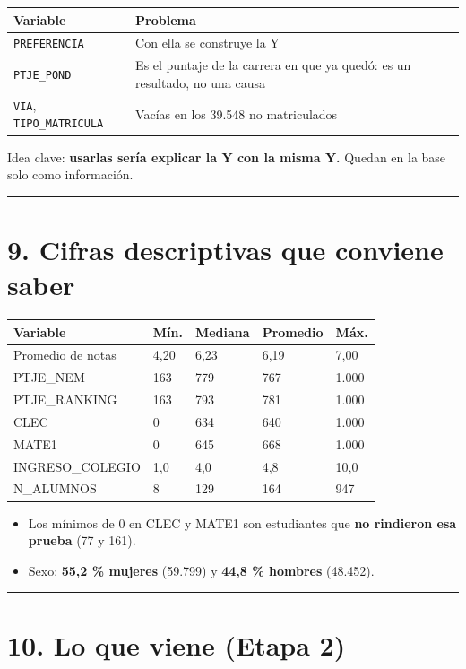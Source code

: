 \documentclass[11pt]{article}
\begin{document}
\begin{tabularx}{\linewidth}{lX}\toprule
\textbf{Variable} & \textbf{Problema}\\ \midrule
\texttt{PREFERENCIA} & Con ella se construye la Y\\
\texttt{PTJE\_POND} & Es el puntaje de la carrera en que ya quedó: es un resultado, no una causa\\
\texttt{VIA}, \texttt{TIPO\_MATRICULA} & Vacías en los 39.548 no matriculados\\
\bottomrule\end{tabularx}\medskip

Idea clave: \textbf{usarlas sería explicar la Y con la misma Y.} Quedan en la base solo como información.\par

\medskip\hrule\medskip

\section*{9. Cifras descriptivas que conviene saber}

\begin{tabularx}{\linewidth}{Xllll}\toprule
\textbf{Variable} & \textbf{Mín.} & \textbf{Mediana} & \textbf{Promedio} & \textbf{Máx.}\\ \midrule
Promedio de notas & 4,20 & 6,23 & 6,19 & 7,00\\
PTJE\_NEM & 163 & 779 & 767 & 1.000\\
PTJE\_RANKING & 163 & 793 & 781 & 1.000\\
CLEC & 0 & 634 & 640 & 1.000\\
MATE1 & 0 & 645 & 668 & 1.000\\
INGRESO\_COLEGIO & 1,0 & 4,0 & 4,8 & 10,0\\
N\_ALUMNOS & 8 & 129 & 164 & 947\\
\bottomrule\end{tabularx}\medskip

\begin{itemize}
\item Los mínimos de 0 en CLEC y MATE1 son estudiantes que \textbf{no rindieron esa prueba} (77 y 161).
\item Sexo: \textbf{55,2 \% mujeres} (59.799) y \textbf{44,8 \% hombres} (48.452).
\end{itemize}

\medskip\hrule\medskip

\section*{10. Lo que viene (Etapa 2)}
\end{document}
